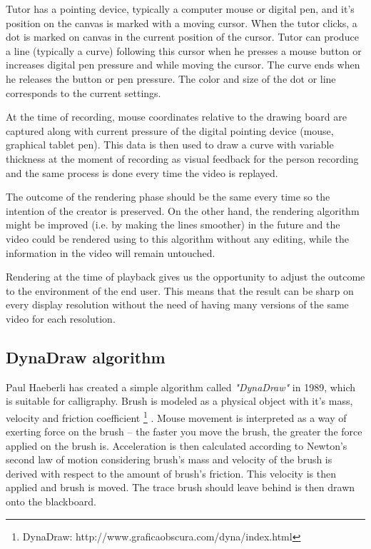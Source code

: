 Tutor has a pointing device, typically a computer mouse or digital pen, and it's position on the canvas is marked with a moving cursor. When the tutor clicks, a dot is marked on canvas in the current position of the cursor. Tutor can produce a line (typically a curve) following this cursor when he presses a mouse button or increases digital pen pressure and while moving the cursor. The curve ends when he releases the button or pen pressure. The color and size of the dot or line corresponds to the current settings.

At the time of recording, mouse coordinates relative to the drawing board are captured along with current pressure of the digital pointing device (mouse, graphical tablet pen). This data is then used to draw a curve with variable thickness at the moment of recording as visual feedback for the person recording and the same process is done every time the video is replayed.

The outcome of the rendering phase should be the same every time so the intention of the creator is preserved. On the other hand, the rendering algorithm might be improved (i.e. by making the lines smoother) in the future and the video could be rendered using to this algorithm without any editing, while the information in the video will remain untouched.

Rendering at the time of playback gives us the opportunity to adjust the outcome to the environment of the end user. This means that the result can be sharp on every display resolution without the need of having many versions of the same video for each resolution.

\subsection{DynaDraw algorithm}

Paul Haeberli has created a simple algorithm called \textit{"DynaDraw"} in 1989, which is suitable for calligraphy. Brush is modeled as a physical object with it's mass, velocity and friction coefficient \footnote{DynaDraw: http://www.graficaobscura.com/dyna/index.html} \cite{}. Mouse movement is interpreted as a way of exerting force on the brush -- the faster you move the brush, the greater the force applied on the brush is. Acceleration is then calculated according to Newton's second law of motion considering brush's mass and velocity of the brush is derived with respect to the amount of brush's friction. This velocity is then applied and brush is moved. The trace brush should leave behind is then drawn onto the blackboard.

